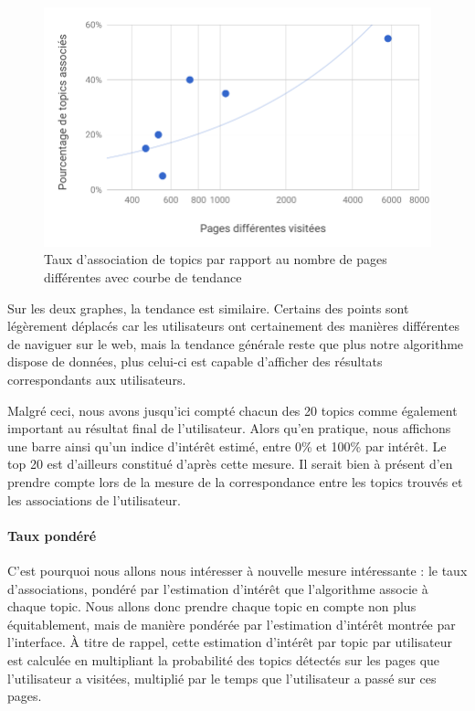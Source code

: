 			\begin{figure}[!h]
				\centering
				\includegraphics[height=0.6\textwidth]{images/results/chart-3}
				\caption{Taux d'association de topics par rapport au nombre de pages différentes avec courbe de tendance}
				\label{chart-3}
			\end{figure}

			Sur les deux graphes, la tendance est similaire. Certains des points sont légèrement déplacés car les utilisateurs ont certainement des manières différentes de naviguer sur le web, mais la tendance générale reste que plus notre algorithme dispose de données, plus celui-ci est capable d'afficher des résultats correspondants aux utilisateurs.

			Malgré ceci, nous avons jusqu'ici compté chacun des 20 topics comme également important au résultat final de l'utilisateur. Alors qu'en pratique, nous affichons une barre ainsi qu'un indice d'intérêt estimé, entre 0\% et 100\% par intérêt. Le top 20 est d'ailleurs constitué d'après cette mesure. Il serait bien à présent d'en prendre compte lors de la mesure de la correspondance entre les topics trouvés et les associations de l'utilisateur.

			\paragraph{Taux pondéré}\label{taux2} C'est pourquoi nous allons nous intéresser à nouvelle mesure intéressante : le taux d'associations, pondéré par l'estimation d'intérêt que l'algorithme associe à chaque topic. Nous allons donc prendre chaque topic en compte non plus équitablement, mais de manière pondérée par l'estimation d'intérêt montrée par l'interface. À titre de rappel,  cette estimation d'intérêt par topic par utilisateur est calculée en multipliant la probabilité des topics détectés sur les pages que l'utilisateur a visitées, multiplié par le temps que l'utilisateur a passé sur ces pages.


